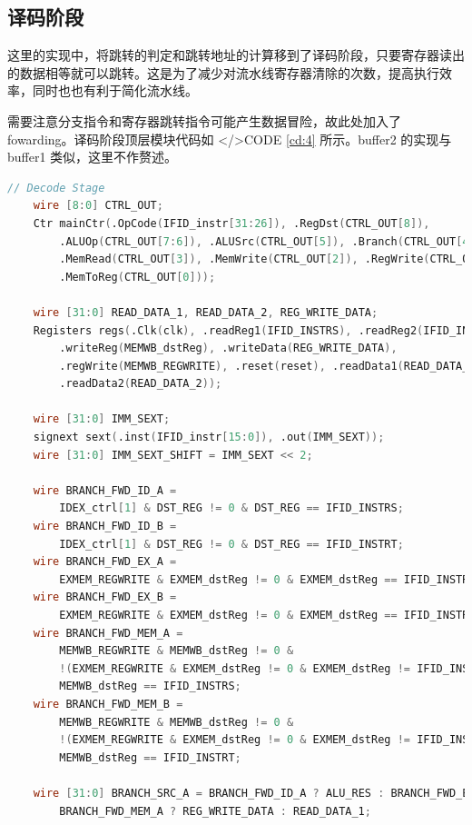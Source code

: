 \documentclass{progartcn}
\begin{document}
\subsection{译码阶段}

这里的实现中，将跳转的判定和跳转地址的计算移到了译码阶段，只要寄存器读出的数据相等就可以跳转。这是为了减少对流水线寄存器清除的次数，提高执行效率，同时也也有利于简化流水线。

需要注意分支指令和寄存器跳转指令可能产生数据冒险，故此处加入了 fowarding。译码阶段顶层模块代码如 </>CODE \ref{cd:4} 所示。buffer2 的实现与 buffer1 类似，这里不作赘述。

\begin{lstlisting}[language=verilog,caption={译码阶段},label={cd:5}]
    // Decode Stage
    wire [8:0] CTRL_OUT;
    Ctr mainCtr(.OpCode(IFID_instr[31:26]), .RegDst(CTRL_OUT[8]), 
        .ALUOp(CTRL_OUT[7:6]), .ALUSrc(CTRL_OUT[5]), .Branch(CTRL_OUT[4]),
        .MemRead(CTRL_OUT[3]), .MemWrite(CTRL_OUT[2]), .RegWrite(CTRL_OUT[1]),
        .MemToReg(CTRL_OUT[0]));
    
    wire [31:0] READ_DATA_1, READ_DATA_2, REG_WRITE_DATA;
    Registers regs(.Clk(clk), .readReg1(IFID_INSTRS), .readReg2(IFID_INSTRT), 
        .writeReg(MEMWB_dstReg), .writeData(REG_WRITE_DATA), 
        .regWrite(MEMWB_REGWRITE), .reset(reset), .readData1(READ_DATA_1), 
        .readData2(READ_DATA_2));
    
    wire [31:0] IMM_SEXT;
    signext sext(.inst(IFID_instr[15:0]), .out(IMM_SEXT));
    wire [31:0] IMM_SEXT_SHIFT = IMM_SEXT << 2;
    
    wire BRANCH_FWD_ID_A =
        IDEX_ctrl[1] & DST_REG != 0 & DST_REG == IFID_INSTRS;
    wire BRANCH_FWD_ID_B =
        IDEX_ctrl[1] & DST_REG != 0 & DST_REG == IFID_INSTRT;
    wire BRANCH_FWD_EX_A = 
        EXMEM_REGWRITE & EXMEM_dstReg != 0 & EXMEM_dstReg == IFID_INSTRS;
    wire BRANCH_FWD_EX_B = 
        EXMEM_REGWRITE & EXMEM_dstReg != 0 & EXMEM_dstReg == IFID_INSTRT;
    wire BRANCH_FWD_MEM_A = 
        MEMWB_REGWRITE & MEMWB_dstReg != 0 & 
        !(EXMEM_REGWRITE & EXMEM_dstReg != 0 & EXMEM_dstReg != IFID_INSTRS) &
        MEMWB_dstReg == IFID_INSTRS;
    wire BRANCH_FWD_MEM_B = 
        MEMWB_REGWRITE & MEMWB_dstReg != 0 & 
        !(EXMEM_REGWRITE & EXMEM_dstReg != 0 & EXMEM_dstReg != IFID_INSTRT) &
        MEMWB_dstReg == IFID_INSTRT;
        
    wire [31:0] BRANCH_SRC_A = BRANCH_FWD_ID_A ? ALU_RES : BRANCH_FWD_EX_A ? EXMEM_aluRes : 
        BRANCH_FWD_MEM_A ? REG_WRITE_DATA : READ_DATA_1;


\end{lstlisting}
\end{document}
